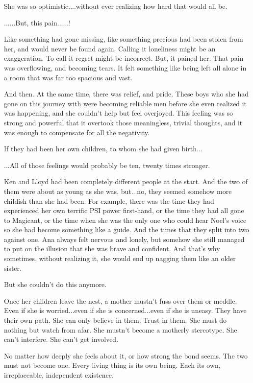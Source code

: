 \documentclass[
]{article}
\begin{document}
She was so optimistic....without ever realizing how hard that would all
be.

......But, this pain......!

Like something had gone missing, like something precious had been stolen
from her, and would never be found again. Calling it loneliness might be
an exaggeration. To call it regret might be incorrect. But, it pained
her. That pain was overflowing, and becoming tears. It felt something
like being left all alone in a room that was far too spacious and vast.

And then. At the same time, there was relief, and pride. These boys who
she had gone on this journey with were becoming reliable men before she
even realized it was happening, and she couldn't help but feel
overjoyed. This feeling was so strong and powerful that it overtook
those meaningless, trivial thoughts, and it was enough to compensate for
all the negativity.

If they had been her own children, to whom she had given birth...

...All of those feelings would probably be ten, twenty times stronger.

Ken and Lloyd had been completely different people at the start. And the
two of them were about as young as she was, but...no, they seemed
somehow more childish than she had been. For example, there was the time
they had experienced her own terrific PSI power first-hand, or the time
they had all gone to Magicant, or the time when she was the only one who
could hear Noel's voice so she had become something like a guide. And
the times that they split into two against one. Ana always felt nervous
and lonely, but somehow she still managed to put on the illusion that
she was brave and confident. And that's why sometimes, without realizing
it, she would end up nagging them like an older sister.

But she couldn't do this anymore.

Once her children leave the nest, a mother mustn't fuss over them or
meddle. Even if she is worried...even if she is concerned...even if she
is uneasy. They have their own path. She can only believe in them. Trust
in them. She must do nothing but watch from afar. She mustn't become a
motherly stereotype. She can't interfere. She can't get involved.

No matter how deeply she feels about it, or how strong the bond seems.
The two must not become one. Every living thing is its own being. Each
its own, irreplaceable, independent existence.
\end{document}
